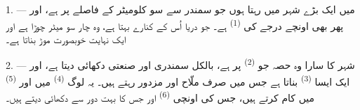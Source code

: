 %
%
%

\VUsaut{2.0mm}
\VUsaut{3.0mm}
\VUfilet{16mm}
\VUsaut{5.6mm}
\VUsaut{1.4mm}
\VUsaut{2.2mm}

\VUsaut{3.0mm}

1. --- میں ایک بڑے شہر میں رہتا ہوں جو سمندر سے سو کلومیٹر کے فاصلے
پر ہے، اور پھر بھی اونچے درجے کی 
\textsuperscript{(1)} ہے۔ جو دریا اُس کے کنارے بہتا ہے، وہ چار سو میٹر
چوڑا ہے اور ایک نہایت خوبصورت موڑ بناتا ہے۔

2. --- شہر کا سارا وہ حصہ جو  \textsuperscript{(2)} پر
ہے، بالکل سمندری اور صنعتی دکھائی دیتا ہے، اور ایک ایسا
 \textsuperscript{(3)} بناتا ہے جس میں صرف ملّاح
اور مزدور رہتے ہیں۔ یہ لوگ  \textsuperscript{(4)} میں
اور  \textsuperscript{(5)} میں کام کرتے ہیں، جس کی
اونچی  \textsuperscript{(6)} اور جس کا  بہت دور سے دکھائی دیتے ہیں۔

